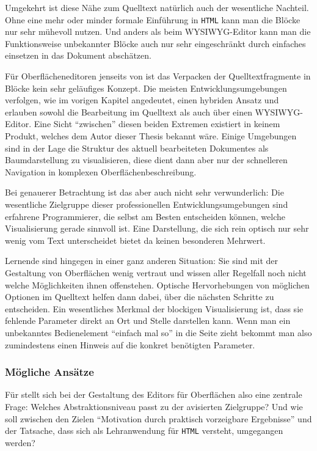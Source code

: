 Umgekehrt ist diese Nähe zum Quelltext natürlich auch der wesentliche Nachteil. Ohne eine mehr oder minder formale Einführung in \texttt{HTML} kann man die Blöcke nur sehr mühevoll nutzen. Und anders als beim WYSIWYG-Editor kann man die Funktionsweise unbekannter Blöcke auch nur sehr eingeschränkt durch einfaches einsetzen in das Dokument abschätzen.

Für Oberflächeneditoren jenseits von \idename{} ist das Verpacken der Quelltextfragmente in Blöcke kein sehr geläufiges Konzept. Die meisten Entwicklungsumgebungen verfolgen, wie im vorigen Kapitel angedeutet, einen hybriden Ansatz und erlauben sowohl die Bearbeitung im Quelltext als auch über einen WYSIWYG-Editor. Eine Sicht "`zwischen"' diesen beiden Extremen existiert in keinem Produkt, welches dem Autor dieser Thesis bekannt wäre. Einige Umgebungen sind in der Lage die Struktur des aktuell bearbeiteten Dokumentes als Baumdarstellung zu visualisieren, diese dient dann aber nur der schnelleren Navigation in komplexen Oberflächenbeschreibung.

Bei genauerer Betrachtung ist das aber auch nicht sehr verwunderlich: Die wesentliche Zielgruppe dieser professionellen Entwicklungsumgebungen sind erfahrene Programmierer, die selbst am Besten entscheiden können, welche Visualisierung gerade sinnvoll ist. Eine Darstellung, die sich rein optisch nur sehr wenig vom Text unterscheidet bietet da keinen besonderen Mehrwert.

Lernende sind hingegen in einer ganz anderen Situation: Sie sind mit der Gestaltung von Oberflächen wenig vertraut und wissen aller Regelfall noch nicht welche Möglichkeiten ihnen offenstehen. Optische Hervorhebungen von möglichen Optionen im Quelltext helfen dann dabei, über die nächsten Schritte zu entscheiden. Ein wesentliches Merkmal der blockigen Visualisierung ist, dass sie fehlende Parameter direkt an Ort und Stelle darstellen kann. Wenn man ein unbekanntes Bedienelement "`einfach mal so"' in die Seite zieht bekommt man also zumindestens einen Hinweis auf die konkret benötigten Parameter.

\subsubsection{Mögliche Ansätze}

Für \idename{} stellt sich bei der Gestaltung des Editors für Oberflächen also eine zentrale Frage: Welches Abstraktionsniveau passt zu der avisierten Zielgruppe? Und wie soll zwischen den Zielen "`Motivation durch praktisch vorzeigbare Ergebnisse"' und der Tatsache, dass \idename{} sich als Lehranwendung für \texttt{HTML} versteht, umgegangen werden?


